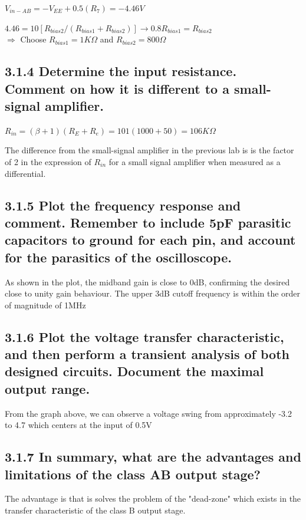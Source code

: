 \documentclass[12pt]{article}
\begin{document}
$V_{in-AB} = -V_{EE} + 0.5(R_7) = -4.46 V$ 

$4.46 = 10 [ R_{bias2} / (R_{bias1} + R_{bias2}) ] \rightarrow 0.8 R_{bias1} = R_{bias2}$ \\

$\Rightarrow$ Choose $R_{bias1} = 1K \Omega$ and $R_{bias2} = 800 \Omega$

\subsection*{3.1.4 Determine the input resistance. Comment on how it is different to a small-signal amplifier.}


$R_{in} = (\beta + 1)(R_E+ R_e) = 101(1000+50) = 106K \Omega$

The difference from the small-signal amplifier in the previous lab is is the factor of 2 in the expression of $R_{in}$ for a small signal amplifier when measured as a differential.

\subsection*{3.1.5 Plot the frequency response and comment. Remember to include 5pF parasitic capacitors to ground for each pin, and account for the parasitics of the oscilloscope.}

As shown in the plot, the midband gain is close to 0dB, confirming the desired close to unity gain behaviour. The upper 3dB cutoff frequency is within the order of magnitude of 1MHz


\subsection*{3.1.6 Plot the voltage transfer characteristic, and then perform a transient analysis of both designed circuits. Document the maximal output range.}

From the graph above, we can observe a voltage swing from approximately -3.2 to 4.7 which centers at the input of 0.5V


\subsection*{3.1.7 In summary, what are the advantages and limitations of the class AB output stage?}

The advantage is that is solves the problem of the "dead-zone" which exists in the transfer characteristic of the class B output stage. \\
\end{document}
